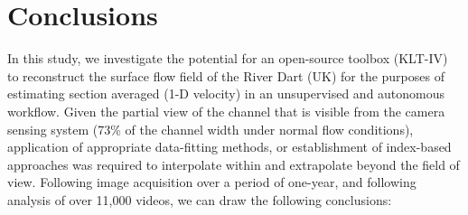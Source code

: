 \documentclass[hess, manuscript]{copernicus} %
\begin{document}
\section{Conclusions}
In this study, we investigate the potential for an open-source toolbox (KLT-IV) to reconstruct the surface flow field of the River Dart (UK) for the purposes of estimating section averaged (1-D velocity) in an unsupervised and autonomous workflow. Given the partial view of the channel that is visible from the camera sensing system (73\% of the channel width under normal flow conditions), application of appropriate data-fitting methods, or establishment of index-based approaches was required to interpolate within and extrapolate beyond the field of view. Following image acquisition over a period of one-year, and following analysis of over 11,000 videos, we can draw the following conclusions:
\end{document}
